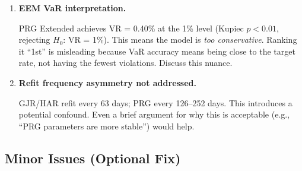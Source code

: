 \documentclass[12pt,a4paper]{article}
\begin{document}
\begin{enumerate}[label=\textbf{M\arabic*}]
Four entries appear in the bibliography but are never cited: Bollerslev (1986), Hansen and Huang (2016), Hansen et al.\ (2012), Tsiakas (2008). Either cite them in the text or remove them.

\item \textbf{EEM VaR interpretation.}

PRG Extended achieves VR = 0.40\% at the 1\% level (Kupiec $p < 0.01$, rejecting $H_0$: VR = 1\%). This means the model is \emph{too conservative}. Ranking it ``1st'' is misleading because VaR accuracy means being close to the target rate, not having the fewest violations. Discuss this nuance.

\item \textbf{Refit frequency asymmetry not addressed.}

GJR/HAR refit every 63 days; PRG every 126--252 days. This introduces a potential confound. Even a brief argument for why this is acceptable (e.g., ``PRG parameters are more stable'') would help.

\end{enumerate}

\subsection*{Minor Issues (Optional Fix)}
\end{document}
